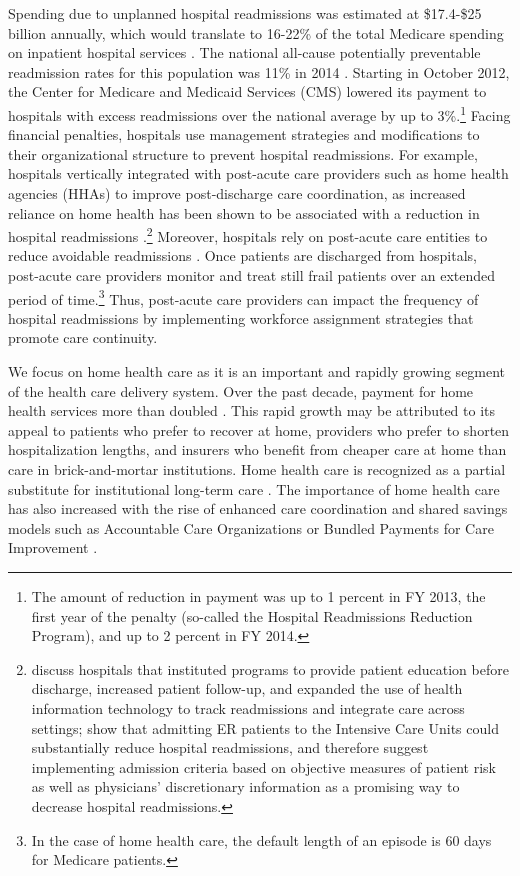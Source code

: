 \documentclass[final,12pt, notitlepage]{article}
\begin{document}
Spending due to unplanned hospital readmissions was estimated at \$17.4-\$25 billion annually, which would translate to 16-22\% of the total Medicare spending on inpatient hospital services \citep{PricewaterhouseCooper2008, Jencks2009}.
The national all-cause potentially preventable readmission rates for this population was 11\% in 2014 \citep{MedPAC2016medicare}.
Starting in October 2012, the Center for Medicare and Medicaid Services (CMS) lowered its payment to hospitals with excess readmissions over the national average by up to 3\%.\footnote{The amount of reduction in payment was up to 1 percent in FY 2013, the first year of the penalty (so-called the Hospital Readmissions Reduction Program), and up to 2 percent in FY 2014.}
Facing financial penalties, hospitals use management strategies and modifications to their organizational structure to prevent hospital readmissions.
For example, hospitals vertically integrated with post-acute care providers such as home health agencies (HHAs) to improve post-discharge care coordination, as increased reliance on home health has been shown to be associated with a reduction in hospital readmissions \citep{Polsky2014}.\footnote{\citet{Naylor1999} discuss hospitals that instituted programs to provide patient education before discharge, increased patient follow-up, and expanded the use of health information technology to track readmissions and integrate care across settings; \citet{Kim2015} show that admitting ER patients to the Intensive Care Units could substantially reduce hospital readmissions, and therefore suggest implementing admission criteria based on objective measures of patient risk as well as physicians' discretionary information as a promising way to decrease hospital readmissions.
}
Moreover, hospitals rely on post-acute care entities to reduce avoidable readmissions \citep{Naylor2012}. Once patients are discharged from hospitals, post-acute care providers monitor and treat still frail patients over an extended period of time.\footnote{In the case of home health care, the default length of an episode is 60 days for Medicare patients.
}
Thus, post-acute care providers can impact the frequency of hospital readmissions by implementing workforce assignment strategies that promote care continuity.








We focus on home health care as it is an important and rapidly growing segment of the health care delivery system.
Over the past decade, payment for home health services more than doubled \citep{MedPAC2016hh}.
This rapid growth may be attributed to its appeal to patients who prefer to recover at home, providers who prefer to shorten hospitalization lengths, and insurers who benefit from cheaper care at home than care in brick-and-mortar institutions. Home health care is recognized as a partial substitute for institutional long-term care \citep{Guo2015}. The importance of home health care has also increased with the rise of enhanced care coordination and shared savings models such as Accountable Care Organizations or Bundled Payments for Care Improvement \citep{Sood2011}.
\end{document}
